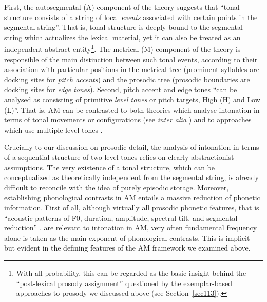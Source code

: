 First, the autosegmental (A) component of the theory suggests that ``tonal structure consists of a string of local \textit{events} associated with certain points in the segmental string''. That is, tonal structure is deeply bound to the segmental string which actualizes the lexical material, yet it can also be treated as an independent abstract entity\footnote{With all probability, this can be regarded as the basic insight behind the ``post-lexical prosody assignment'' questioned by the exemplar-based approaches to prosody we discussed above (see Section~\ref{sec113}).}. The metrical (M) component of the theory is responsible of the main distinction between such tonal events, according to their association with particular positions in the metrical tree (prominent syllables are docking sites for \textit{pitch accents}) and the prosodic tree (prosodic boundaries are docking sites for \textit{edge tones}). Second, pitch accent and edge tones ``can be analysed as consisting of primitive \textit{level tones} or pitch targets, High (H) and Low (L)''. That is, AM can be contrasted to both theories which analyse intonation in terms of tonal movements or configurations (see \textit{inter alia} \citealt{bolinger1951intonation,delattre1966dix,isavcenko1970untersuchungen,tHart1990perceptual}) and to approaches which use multiple level tones \citep{pike1945intonation,wells1945pitch,trager1951outline}.

Crucially to our discussion on prosodic detail, the analysis of intonation in terms of a sequential structure of two level tones relies on clearly abstractionist assumptions. The very existence of a tonal structure, which can be conceptualized as theoretically independent from the segmental string, is already difficult to reconcile with the idea of purely episodic storage. Moreover, establishing phonological contrasts in AM entails a massive reduction of phonetic information. First of all, although virtually all prosodic phonetic features, that is ``acoustic patterns of F0, duration, amplitude, spectral tilt, and segmental reduction'' \citep{shattuck1996prosody}, are relevant to intonation in AM, very often fundamental frequency alone is taken as the main exponent of phonological contrasts. This is implicit but evident in the defining features of the AM framework we examined above.

